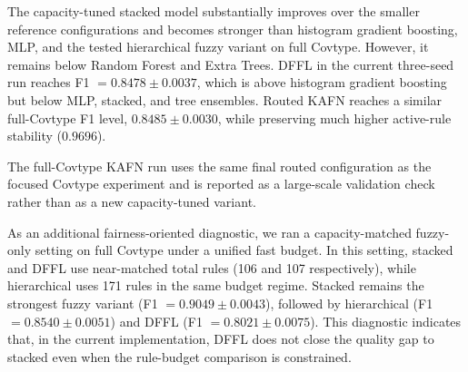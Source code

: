 \documentclass[runningheads]{llncs}
\begin{document}
\begin{table}[H]
\centering
\caption{Large-scale results on full \textit{covtype\_binary} (three-seed results).}
\label{tab:covtype_capacity_check}
\scriptsize
\setlength{\tabcolsep}{4pt}
\end{table}

The capacity-tuned stacked model substantially improves over the smaller reference configurations and becomes stronger than histogram gradient boosting, MLP, and the tested hierarchical fuzzy variant on full Covtype. However, it remains below Random Forest and Extra Trees. DFFL in the current three-seed run reaches F1 $=0.8478\pm0.0037$, which is above histogram gradient boosting but below MLP, stacked, and tree ensembles. Routed KAFN reaches a similar full-Covtype F1 level, $0.8485\pm0.0030$, while preserving much higher active-rule stability ($0.9696$).

The full-Covtype KAFN run uses the same final routed configuration as the focused Covtype experiment and is reported as a large-scale validation check rather than as a new capacity-tuned variant.

As an additional fairness-oriented diagnostic, we ran a capacity-matched fuzzy-only setting on full Covtype under a unified fast budget. In this setting, stacked and DFFL use near-matched total rules (106 and 107 respectively), while hierarchical uses 171 rules in the same budget regime. Stacked remains the strongest fuzzy variant (F1 $=0.9049\pm0.0043$), followed by hierarchical (F1 $=0.8540\pm0.0051$) and DFFL (F1 $=0.8021\pm0.0075$). This diagnostic indicates that, in the current implementation, DFFL does not close the quality gap to stacked even when the rule-budget comparison is constrained.
\end{document}
